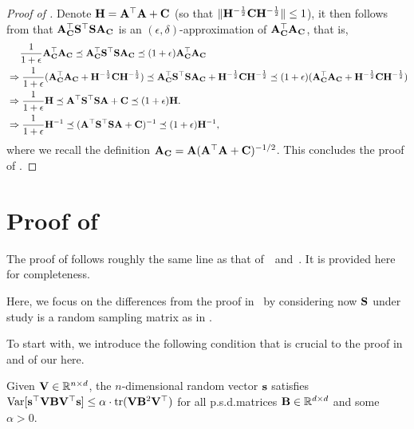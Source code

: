 \documentclass[11pt,a4paper]{article}
\begin{document}
\begin{proof}[Proof of ]
Denote $\H=\A^\top\A+\C$ (so that $\| \H^{-\frac{1}{2}}\C\H^{-\frac{1}{2}} \| \leq 1$), it then follows from  that $\A_\C^\top\S^\top \S\A_\C$ is an $(\epsilon,\delta)$-approximation of $\A_\C^\top\A_\C$, that is,
\begin{align}
& ~~~~\frac{1}{1+\epsilon}\A_\C^\top\A_\C\preceq\A_\C^\top\S^\top \S\A_\C\preceq(1+\epsilon)\A_\C^\top\A_\C\nonumber\\
&  \Rightarrow \frac{1}{1+\epsilon}(\A_\C^\top\A_\C+\H^{-\frac{1}{2}}\C\H^{-\frac{1}{2}})\preceq\A_\C^\top\S^\top \S\A_\C+\H^{-\frac{1}{2}}\C\H^{-\frac{1}{2}}\preceq(1+\epsilon)(\A_\C^\top\A_\C+\H^{-\frac{1}{2}}\C\H^{-\frac{1}{2}})\nonumber\\
& \Rightarrow \frac{1}{1+\epsilon}\H\preceq\A^\top\S^\top\S\A+\C\preceq(1+\epsilon)\H.\nonumber\\
  & \Rightarrow \frac{1}{1+\epsilon}\H^{-1}\preceq(\A^\top\S^\top\S\A+\C)^{-1}\preceq(1+\epsilon)\H^{-1},\nonumber
\end{align}
where we recall the definition $\A_\C = \A (\A^\top \A + \C)^{-1/2}$.
This concludes the proof of .
\end{proof}




\section{Proof of  }
\label{sec:proof_coarse-RS}


The proof of  follows roughly the same line as that of~\citet[Theorem~6]{derezinski2021newtonless}~and~\citet[Theorem~11]{derezinski2021sparse}.
It is provided here for completeness.

Here, we focus on the differences from the proof in~\citet{derezinski2021newtonless,derezinski2021sparse} by considering now $\S$ under study is a random sampling matrix as in . 

To start with, we introduce the following condition that is crucial to the proof in~\citet{derezinski2021newtonless, derezinski2021sparse} and of our  here.

\begin{condition}\label{con:property_S}
    Given $\V\in \RR^{n\times d}$, the $n$-dimensional random vector $\s$ satisfies $\Var[\s^\top \V\B\V^\top \s]\leq \alpha\cdot \tr(\V\B^2\V^\top)$ for all p.s.d.\@ matrices $\B \in \RR^{d \times d}$ and some $\alpha>0$.
\end{condition}
\end{document}
